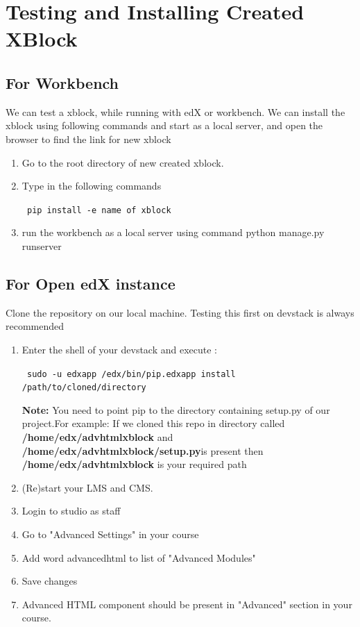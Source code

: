 \section{Testing and Installing Created XBlock}
\subsection{For Workbench}
We can test a xblock, while running with edX or workbench. We can install the xblock using following
commands and start as a local server, and open the browser to find the link for new xblock
\begin{enumerate}
\item Go to the root directory of new created xblock.
\item Type in the following commands\begin{center}\verb= pip install -e name of xblock=\end{center}
\item run the workbench as a local server using command python manage.py
runserver
\end{enumerate}


\subsection{For Open edX instance}
Clone the repository on our local machine. Testing this first on devstack is always recommended
\begin{enumerate}
\item Enter the shell of your devstack and execute :
\begin{center}\verb= sudo -u edxapp /edx/bin/pip.edxapp install /path/to/cloned/directory=\end{center}
\textbf{Note:} You need to point pip to the directory containing setup.py of our project.\newline For
example: If we cloned this repo in directory called\textbf{ /home/edx/advhtmlxblock} and
\textbf{/home/edx/advhtmlxblock/setup.py}is present then\textbf{ /home/edx/advhtmlxblock} is your
required path
\item (Re)start your LMS and CMS.
\item Login to studio as staff
\item Go to "Advanced Settings" in your course
\item Add word advancedhtml to list of "Advanced Modules"
\item Save changes
\item Advanced HTML component should be present in "Advanced" section in your course.
\end{enumerate}




